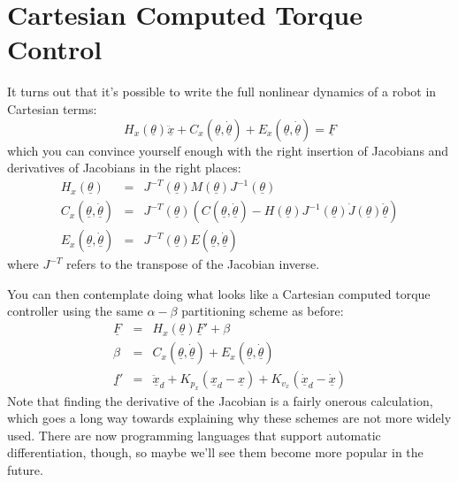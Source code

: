\documentclass[]{article}
\begin{document}
\section{Cartesian Computed Torque Control}
It turns out that it's possible to write the full nonlinear dynamics of a robot in Cartesian terms:
\begin{displaymath}
 H_{x}(\underline{\theta})\ddot{\underline{x}} + C_{x}(\underline{\theta}, \dot{\underline{\theta}}) + E_{x}(\underline{\theta}, \underline{\dot{\theta}}) = \underline{F}
\end{displaymath}
which you can convince yourself enough with the right insertion of Jacobians and derivatives of Jacobians in the right places:
\begin{eqnarray}
	H_{x}(\underline{\theta}) & = & J^{-T}(\underline{\theta})M(\underline{\theta})J^{-1}(\underline{\theta}) \nonumber \\
	C_{x}(\underline{\theta}, \dot{\underline{\theta}}) & = & J^{-T}(\underline{\theta})\left(C(\underline{\theta}, \dot{\underline{\theta}}) - H(\underline{\theta})J^{-1}(\underline{\theta})\dot{J}(\underline{\theta})\dot{\underline{\theta}}\right) \nonumber \\
	E_{x}(\underline{\theta}, \dot{\underline{\theta}}) & = & J^{-T}(\underline{\theta})E(\underline{\theta}, \underline{\dot{\theta}}) \nonumber
\end{eqnarray}
where $J^{-T}$ refers to the transpose of the Jacobian inverse. 

You can then contemplate doing what looks like a Cartesian computed torque controller using the same $\alpha-\beta$ partitioning scheme as before:
\begin{eqnarray}
 \underline{F} & = & H_{x}(\underline{\theta})\underline{F}' + \beta \nonumber \\
 \beta & = & C_{x}(\underline{\theta}, \dot{\underline{\theta}}) + E_{x}(\underline{\theta}, \underline{\dot{\theta}}) \nonumber \\
 \underline{f}' & = & \underline{\ddot{x}}_{d} + K_{p_{x}}(\underline{x}_{d}-\underline{x}) + K_{v_{x}}(\underline{\dot{x}}_{d} - \underline{\dot{x}}) \nonumber
\end{eqnarray}
Note that finding the derivative of the Jacobian is a fairly onerous calculation, which goes a long way towards explaining why these schemes are not more widely used. There are now programming languages that support automatic differentiation, though, so maybe we'll see them become more popular in the future.
\end{document}
